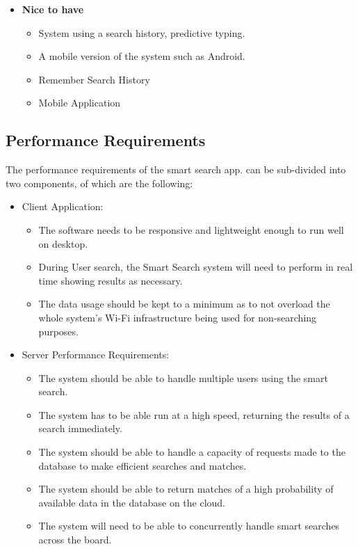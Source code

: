 \documentclass[a4paper,10pt]{article}
\begin{document}
\begin{enumerate}
\begin{itemize}
		\item \textbf{Nice to have}
		\begin{itemize}
		\item System using a search history, predictive typing. 
		\item A mobile version of the system such as Android.
		\item Remember Search History
		\item Mobile Application

		\end{itemize}
\end{itemize}
		\end{enumerate} 
		
		
		
		
	\subsection{Performance Requirements}
	The performance requirements of the smart search app. can be sub-divided into two components, of which are the following:
	\begin{itemize}
	\item Client Application:
		\begin{itemize}
		\item The software needs to be responsive and lightweight enough to run well on desktop.
		\item During User search, the Smart Search system will need to perform in real time showing results as necessary.
		\item The data usage should be kept to a minimum as to not overload the whole system's Wi-Fi infrastructure being used for non-searching purposes.\\
		\end{itemize}

	\item Server Performance Requirements:
		\begin{itemize}
		\item The system should be able to handle multiple users using the smart search.
		\item The system has to be able run at a high speed, returning the results of a search immediately.
		\item The system should be able to handle a capacity of requests made to the database to make efficient searches and matches. 
		\item The system should be able to return matches of a high probability of available data in the database on the cloud.
		\item The system will need to be able to concurrently handle smart searches across the board.
		\end{itemize}
	\end{itemize}
\end{document}
